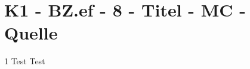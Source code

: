 \section{K1 - BZ.ef - 8 - Titel - MC - Quelle}

\begin{langesbeispiel} \item[1] %
Test Test
\end{langesbeispiel}